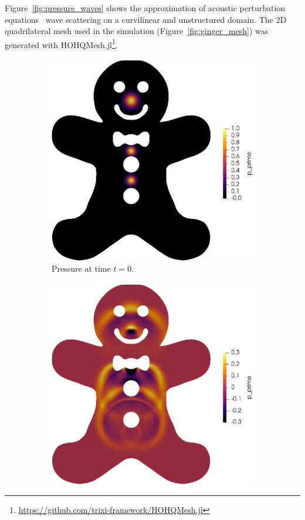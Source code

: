 \documentclass[hidelinks]{juliacon} %
\begin{document}
Figure~\ref{fig:pressure_waves} shows the approximation
of acoustic perturbation equations~\cite{ewert2003acoustic} wave scattering on a
curvilinear and unstructured domain. The 2D quadrilateral mesh used in the simulation
(Figure~\ref{fig:ginger_mesh}) was generated with
HOHQMesh.jl\xspace\footnote{\url{https://github.com/trixi-framework/HOHQMesh.jl}}.
\begin{figure}[!h]
  \begin{subfigure}{0.475\linewidth}
    \includegraphics[width=\textwidth]{../figures/ginger_time_00}
    \caption{Pressure at time $t = 0$.}
  \end{subfigure}%
  \hspace*{\fill}
  \begin{subfigure}{0.475\linewidth}
    \includegraphics[width=\textwidth]{../figures/ginger_time_08}

\end{subfigure}
\end{figure}
\end{document}
